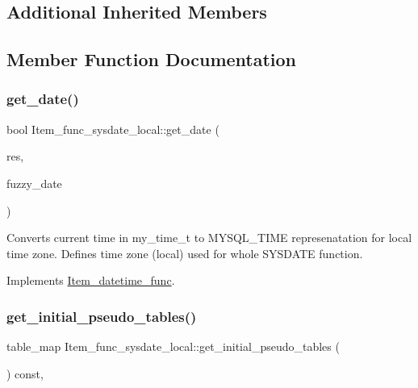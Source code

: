 \subsection*{Additional Inherited Members}


\subsection{Member Function Documentation}
\mbox{\label{classItem__func__sysdate__local_a255101d1f8859223b3467024d66d6f0a}} 
\subsubsection{\texorpdfstring{get\+\_\+date()}{get\_date()}}
{\footnotesize\ttfamily bool Item\+\_\+func\+\_\+sysdate\+\_\+local\+::get\+\_\+date (\begin{DoxyParamCaption}\item[{M\+Y\+S\+Q\+L\+\_\+\+T\+I\+ME $\ast$}]{res,  }\item[{my\+\_\+time\+\_\+flags\+\_\+t}]{fuzzy\+\_\+date }\end{DoxyParamCaption})\hspace{0.3cm}{\ttfamily [virtual]}}

Converts current time in my\+\_\+time\+\_\+t to M\+Y\+S\+Q\+L\+\_\+\+T\+I\+ME represenatation for local time zone. Defines time zone (local) used for whole S\+Y\+S\+D\+A\+TE function. 

Implements \mbox{\hyperlink{classItem__datetime__func}{Item\+\_\+datetime\+\_\+func}}.

\mbox{\label{classItem__func__sysdate__local_a89c15806cffaf36b3b37d19e97a829e3}} 
\subsubsection{\texorpdfstring{get\+\_\+initial\+\_\+pseudo\+\_\+tables()}{get\_initial\_pseudo\_tables()}}
{\footnotesize\ttfamily table\+\_\+map Item\+\_\+func\+\_\+sysdate\+\_\+local\+::get\+\_\+initial\+\_\+pseudo\+\_\+tables (\begin{DoxyParamCaption}{ }\end{DoxyParamCaption}) const\hspace{0.3cm}{\ttfamily [inline]}, {\ttfamily [virtual]}}

